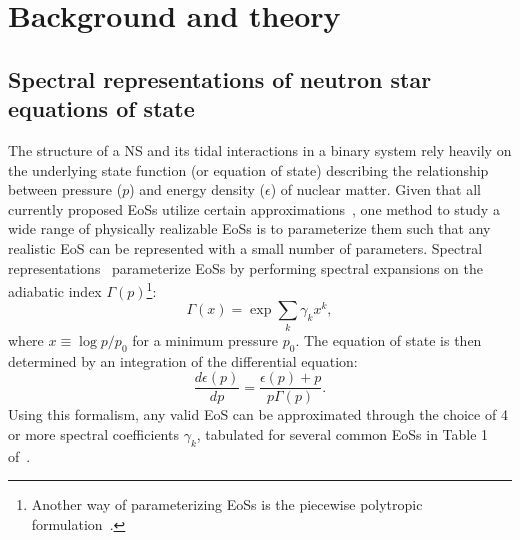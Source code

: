 \documentclass[prd,twocolumn,nofootinbib,superscriptaddress,amsmath,amssymb]{revtex4-1}
\begin{document}
\section{Background and theory}\label{sec:theory}

\subsection{Spectral representations of neutron star equations of state}\label{sec:eos}
The structure of a NS and its tidal interactions in a binary system rely heavily on the underlying state function (or equation of state) describing the relationship between pressure ($p$) and energy density ($\epsilon$) of nuclear matter.
Given that all currently proposed EoSs utilize certain approximations~\cite{Oertel:Review,Baym:Review}, one method to study a wide range of physically realizable EoSs is to parameterize them such that any realistic EoS can be represented with a small number of parameters.
Spectral representations~\cite{Lindblom:2010bb,Lindblom:2012zi,Lindblom:2013kra,Lindblom:2018rfr,Abbott:2018exr} parameterize EoSs by performing spectral expansions on the adiabatic index $\Gamma(p)$\footnote{Another way of parameterizing EoSs is the piecewise polytropic formulation~\cite{Read2009,Lackey:2014fwa,Carney:2018sdv}.}:
\begin{equation}
\Gamma(x) = \exp{\sum_k\gamma_k x^k},
\end{equation}
where $x \equiv \log{p/p_0}$ for a minimum pressure $p_0$.
The equation of state is then determined by an integration of the differential equation:
\begin{equation}
\frac{d \epsilon(p)}{dp}=\frac{\epsilon(p)+p}{p \Gamma(p)}.
\end{equation}
Using this formalism, any valid EoS can be approximated through the choice of 4 or more spectral coefficients $\gamma_k$, tabulated for several common EoSs in Table 1 of~\cite{Lindblom:2018rfr}.
\end{document}
